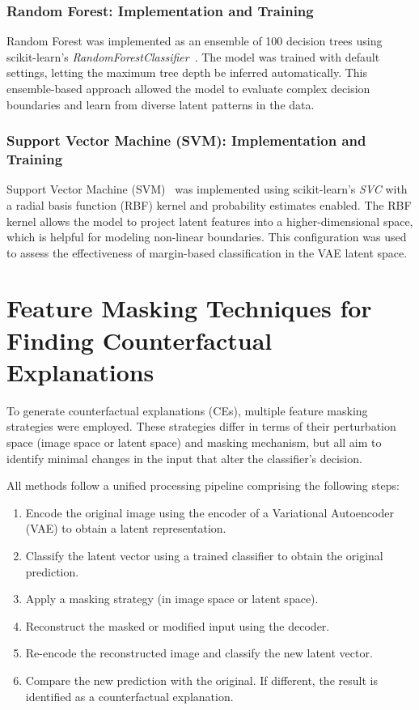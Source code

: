 \subsubsection{Random Forest: Implementation and Training}
\label{subsubsec:random_forest}
Random Forest was implemented as an ensemble of 100 decision trees using scikit-learn’s \textit{RandomForestClassifier}~\cite{Breiman2001}. The model was trained with default settings, letting the maximum tree depth be inferred automatically. This ensemble-based approach allowed the model to evaluate complex decision boundaries and learn from diverse latent patterns in the data.

\subsubsection{Support Vector Machine (SVM): Implementation and Training}
\label{subsubsec:svm}
Support Vector Machine (SVM)~\cite{Cortes1995} was implemented using scikit-learn’s \textit{SVC} with a radial basis function (RBF) kernel and probability estimates enabled. The RBF kernel allows the model to project latent features into a higher-dimensional space, which is helpful for modeling non-linear boundaries. This configuration was used to assess the effectiveness of margin-based classification in the VAE latent space.




\section{Feature Masking Techniques for Finding Counterfactual Explanations}
\label{sec:feature_masking_pipeline}

To generate counterfactual explanations (CEs), multiple feature masking strategies were employed. These strategies differ in terms of their perturbation space (image space or latent space) and masking mechanism, but all aim to identify minimal changes in the input that alter the classifier’s decision.

All methods follow a unified processing pipeline comprising the following steps:

\begin{enumerate}
    \item Encode the original image using the encoder of a Variational Autoencoder (VAE) to obtain a latent representation.
    \item Classify the latent vector using a trained classifier to obtain the original prediction.
    \item Apply a masking strategy (in image space or latent space).
    \item Reconstruct the masked or modified input using the decoder.
    \item Re-encode the reconstructed image and classify the new latent vector.
    \item Compare the new prediction with the original. If different, the result is identified as a counterfactual explanation.
\end{enumerate}

